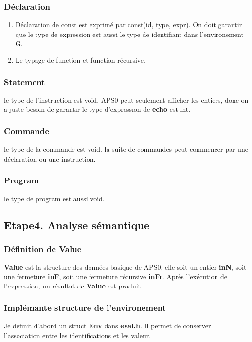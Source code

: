 \documentclass[14px]{article}
\begin{document}
\subsubsection{Déclaration}
\begin{enumerate}
	\item Déclaration de const est exprimé par const(id, type, expr). On doit garantir que le type de expression est aussi le type de identifiant dans l'environement G.
	\item Le typage de function et function récursive.
\end{enumerate}

\subsubsection{Statement}
le type de l'instruction est void. APS0 peut seulement afficher les entiers, donc on a juste besoin de garantir le type d'expression de \textbf{echo} est int. 

\subsubsection{Commande}
le type de la commande est void. la suite de commandes peut commencer par une déclaration ou une instruction.

\subsubsection{Program}
le type de program est aussi void.

\subsection{Etape4. Analyse sémantique}
\subsubsection{Définition de Value}
\textbf{Value} est la structure des données basique de APS0, elle soit un entier \textbf{inN}, soit une fermeture \textbf{inF}, soit une fermeture récursive \textbf{inFr}. Après l'exécution de l'expression, un résultat de \textbf{Value} est produit.

\subsubsection{Implémante structure de l'environement}
Je définit d'abord un struct \textbf{Env } dans \textbf{eval.h}. Il permet de conserver l'association entre les identifications et les valeur.
\end{document}
